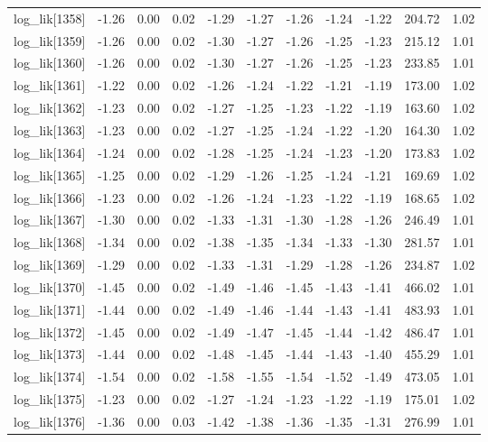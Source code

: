 \begin{table}[ht]
\begin{tabular}{rrrrrrrrrrr}
  log\_lik[1358] & -1.26 & 0.00 & 0.02 & -1.29 & -1.27 & -1.26 & -1.24 & -1.22 & 204.72 & 1.02 \\ 
  log\_lik[1359] & -1.26 & 0.00 & 0.02 & -1.30 & -1.27 & -1.26 & -1.25 & -1.23 & 215.12 & 1.01 \\ 
  log\_lik[1360] & -1.26 & 0.00 & 0.02 & -1.30 & -1.27 & -1.26 & -1.25 & -1.23 & 233.85 & 1.01 \\ 
  log\_lik[1361] & -1.22 & 0.00 & 0.02 & -1.26 & -1.24 & -1.22 & -1.21 & -1.19 & 173.00 & 1.02 \\ 
  log\_lik[1362] & -1.23 & 0.00 & 0.02 & -1.27 & -1.25 & -1.23 & -1.22 & -1.19 & 163.60 & 1.02 \\ 
  log\_lik[1363] & -1.23 & 0.00 & 0.02 & -1.27 & -1.25 & -1.24 & -1.22 & -1.20 & 164.30 & 1.02 \\ 
  log\_lik[1364] & -1.24 & 0.00 & 0.02 & -1.28 & -1.25 & -1.24 & -1.23 & -1.20 & 173.83 & 1.02 \\ 
  log\_lik[1365] & -1.25 & 0.00 & 0.02 & -1.29 & -1.26 & -1.25 & -1.24 & -1.21 & 169.69 & 1.02 \\ 
  log\_lik[1366] & -1.23 & 0.00 & 0.02 & -1.26 & -1.24 & -1.23 & -1.22 & -1.19 & 168.65 & 1.02 \\ 
  log\_lik[1367] & -1.30 & 0.00 & 0.02 & -1.33 & -1.31 & -1.30 & -1.28 & -1.26 & 246.49 & 1.01 \\ 
  log\_lik[1368] & -1.34 & 0.00 & 0.02 & -1.38 & -1.35 & -1.34 & -1.33 & -1.30 & 281.57 & 1.01 \\ 
  log\_lik[1369] & -1.29 & 0.00 & 0.02 & -1.33 & -1.31 & -1.29 & -1.28 & -1.26 & 234.87 & 1.02 \\ 
  log\_lik[1370] & -1.45 & 0.00 & 0.02 & -1.49 & -1.46 & -1.45 & -1.43 & -1.41 & 466.02 & 1.01 \\ 
  log\_lik[1371] & -1.44 & 0.00 & 0.02 & -1.49 & -1.46 & -1.44 & -1.43 & -1.41 & 483.93 & 1.01 \\ 
  log\_lik[1372] & -1.45 & 0.00 & 0.02 & -1.49 & -1.47 & -1.45 & -1.44 & -1.42 & 486.47 & 1.01 \\ 
  log\_lik[1373] & -1.44 & 0.00 & 0.02 & -1.48 & -1.45 & -1.44 & -1.43 & -1.40 & 455.29 & 1.01 \\ 
  log\_lik[1374] & -1.54 & 0.00 & 0.02 & -1.58 & -1.55 & -1.54 & -1.52 & -1.49 & 473.05 & 1.01 \\ 
  log\_lik[1375] & -1.23 & 0.00 & 0.02 & -1.27 & -1.24 & -1.23 & -1.22 & -1.19 & 175.01 & 1.02 \\ 
  log\_lik[1376] & -1.36 & 0.00 & 0.03 & -1.42 & -1.38 & -1.36 & -1.35 & -1.31 & 276.99 & 1.01 \\ 

\end{tabular}
\end{table}
